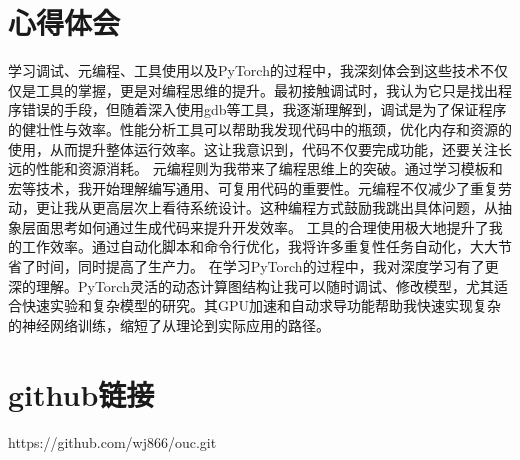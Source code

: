 \documentclass{article}
\begin{document}
\section{心得体会}
学习调试、元编程、工具使用以及PyTorch的过程中，我深刻体会到这些技术不仅仅是工具的掌握，更是对编程思维的提升。最初接触调试时，我认为它只是找出程序错误的手段，但随着深入使用gdb等工具，我逐渐理解到，调试是为了保证程序的健壮性与效率。性能分析工具可以帮助我发现代码中的瓶颈，优化内存和资源的使用，从而提升整体运行效率。这让我意识到，代码不仅要完成功能，还要关注长远的性能和资源消耗。
元编程则为我带来了编程思维上的突破。通过学习模板和宏等技术，我开始理解编写通用、可复用代码的重要性。元编程不仅减少了重复劳动，更让我从更高层次上看待系统设计。这种编程方式鼓励我跳出具体问题，从抽象层面思考如何通过生成代码来提升开发效率。
工具的合理使用极大地提升了我的工作效率。通过自动化脚本和命令行优化，我将许多重复性任务自动化，大大节省了时间，同时提高了生产力。
在学习PyTorch的过程中，我对深度学习有了更深的理解。PyTorch灵活的动态计算图结构让我可以随时调试、修改模型，尤其适合快速实验和复杂模型的研究。其GPU加速和自动求导功能帮助我快速实现复杂的神经网络训练，缩短了从理论到实际应用的路径。

\section{github链接}
https://github.com/wj866/ouc.git
\end{document}
